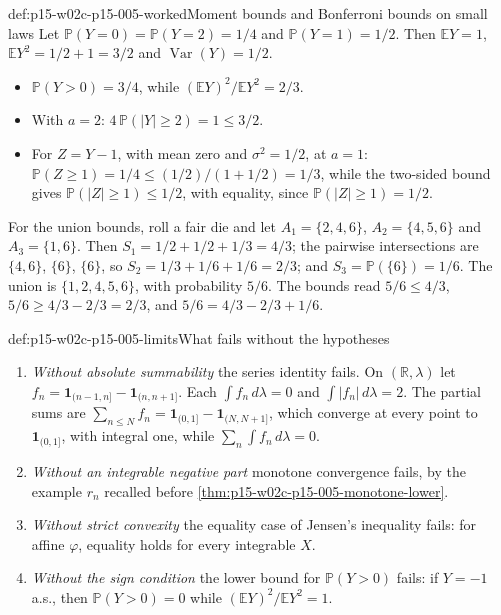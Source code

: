 \begin{hbexample}{def:p15-w02c-p15-005-worked}{Moment bounds and Bonferroni bounds on small laws}
Let \(\mathbb P(Y=0)=\mathbb P(Y=2)=1/4\) and \(\mathbb P(Y=1)=1/2\).
Then \(\mathbb EY=1\), \(\mathbb EY^2=1/2+1=3/2\) and
\(\operatorname{Var}(Y)=1/2\).
\begin{itemize}
\item \(\mathbb P(Y>0)=3/4\), while
      \((\mathbb EY)^2/\mathbb EY^2=2/3\).
\item With \(a=2\): \(4\,\mathbb P(|Y|\geq2)=1\leq3/2\).
\item For \(Z=Y-1\), with mean zero and \(\sigma^2=1/2\), at \(a=1\):
      \(\mathbb P(Z\geq1)=1/4\leq(1/2)/(1+1/2)=1/3\), while the
      two-sided bound gives \(\mathbb P(|Z|\geq1)\leq1/2\), with
      equality, since \(\mathbb P(|Z|\geq1)=1/2\).
\end{itemize}
For the union bounds, roll a fair die and let
\(A_1=\{2,4,6\}\), \(A_2=\{4,5,6\}\) and \(A_3=\{1,6\}\). Then
\(S_1=1/2+1/2+1/3=4/3\); the pairwise intersections are
\(\{4,6\}\), \(\{6\}\), \(\{6\}\), so \(S_2=1/3+1/6+1/6=2/3\); and
\(S_3=\mathbb P(\{6\})=1/6\). The union is \(\{1,2,4,5,6\}\), with
probability \(5/6\). The bounds read \(5/6\leq4/3\),
\(5/6\geq4/3-2/3=2/3\), and
\(5/6=4/3-2/3+1/6\).
\end{hbexample}

\begin{hbwarning}{def:p15-w02c-p15-005-limits}{What fails without the hypotheses}
\begin{enumerate}
\item \emph{Without absolute summability} the series identity fails.
      On \((\mathbb R,\lambda)\) let
      \(f_n=\mathbf1_{(n-1,n]}-\mathbf1_{(n,n+1]}\). Each
      \(\int f_n\,d\lambda=0\) and \(\int|f_n|\,d\lambda=2\). The
      partial sums are
      \(\sum_{n\leq N}f_n=\mathbf1_{(0,1]}-\mathbf1_{(N,N+1]}\), which
      converge at every point to \(\mathbf1_{(0,1]}\), with integral
      one, while \(\sum_n\int f_n\,d\lambda=0\).
\item \emph{Without an integrable negative part} monotone convergence
      fails, by the example \(r_n\) recalled before
      \cref{thm:p15-w02c-p15-005-monotone-lower}.
\item \emph{Without strict convexity} the equality case of Jensen's
      inequality fails: for affine \(\varphi\), equality holds for
      every integrable \(X\).
\item \emph{Without the sign condition} the lower bound for
      \(\mathbb P(Y>0)\) fails: if \(Y=-1\) a.s., then
      \(\mathbb P(Y>0)=0\) while \((\mathbb EY)^2/\mathbb EY^2=1\).
\end{enumerate}
\end{hbwarning}

